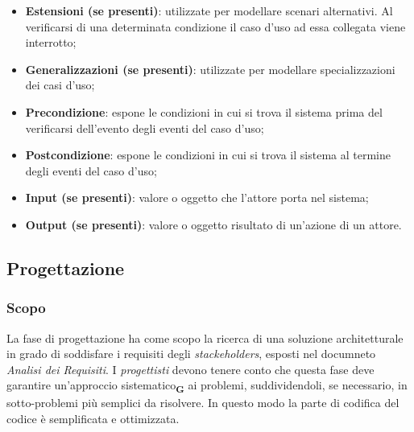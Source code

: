 \begin{itemize}
    \item \textbf{Estensioni (se presenti)}: utilizzate per modellare scenari alternativi. Al verificarsi di una determinata condizione il caso d’uso ad essa collegata viene interrotto;
    \item \textbf{Generalizzazioni (se presenti)}: utilizzate per modellare specializzazioni dei casi d’uso;
    \item \textbf{Precondizione}: espone le condizioni in cui si trova il sistema prima del verificarsi dell’evento degli eventi del caso d’uso;
    \item \textbf{Postcondizione}: espone le condizioni in cui si trova il sistema al termine degli eventi del caso d’uso;
    \item \textbf{Input (se presenti)}: valore o oggetto che l’attore porta nel sistema;
    \item \textbf{Output (se presenti)}: valore o oggetto risultato di un’azione di un attore.
\end{itemize}
\subsection{Progettazione}
\subsubsection{Scopo}
La fase di progettazione ha come scopo la ricerca di una soluzione architetturale in grado di soddisfare i requisiti degli \textit{stackeholders}, esposti nel documneto \textit{Analisi dei Requisiti}.
I \textit{progettisti} devono tenere conto che questa fase deve garantire un'approccio sistematico\textsubscript{\textbf{G}} ai problemi, suddividendoli, se necessario, in sotto-problemi più semplici da risolvere.
In questo modo la parte di codifica del codice è semplificata e ottimizzata.
